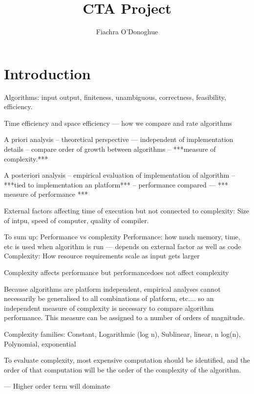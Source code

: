 \documentclass[12pt, a4paper]{article}
\title{CTA Project}
\author{Fiachra O'Donoghue}
\begin{document}
    
\section{Introduction}



Algorithms: input output, finiteness, unambiguous, correctness, feasibility, efficiency.

Time efficiency and space efficiency --- how we compare and rate algorithms

A priori analysis -- theoretical perspective --- independent of implementation details -- compare order of growth between algorithms -- ***measure of complexity.***

A posteriori analysis -- empirical evaluation of implementation of  algorithm -- ***tied to implementation an platform*** -- performance compared --- *** measure of performance ***

External factors affecting time of execution but not connected to complexity:
Size of intpu, speed of computer, quality of compiler.

To sum up: Performance vs complexity
Performance: how much memory, time, etc is used when algorithm is run --- depends on external factor as well as code 
Complexity: How resource requirements scale as input gets larger

Complexity affects performance but performancedoes not affect complexity

Because algorithms are platform independent, empirical analyses cannot necessarily be generalised to all combinations of platform, etc.... so an independent measure of complexity is necessary to compare algorithm performance. This measure can be assigned to a number of orders of magnitude. 

Complexity families:
    Constant, Logarithmic (log n), Sublinear, linear, n log(n), Polynomial, exponential

To evaluate complexity, most expensive computation should be identified, and the order of that computation will be the order of the complexity of the algorithm.

--- Higher order term will dominate 
\end{document}

